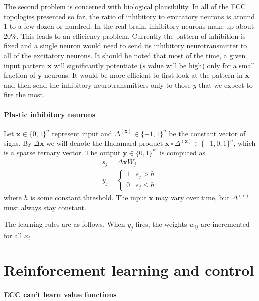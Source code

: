 \documentclass[12pt]{article}
\begin{document}
 The second problem is concerned with biological plausibility. In all of the ECC topologies presented so far, the ratio of inhibitory to excitatory neurons is around 1 to a few dozen or hundred. In the real brain, inhibitory neurons make up about 20\%. This leads to an efficiency problem. Currently the pattern of inhibition is fixed and a single neuron would need to send its inhibitory neurotransmitter to all of the excitatory neurons. It should be noted that most of the time, a given input pattern $\boldsymbol{x}$ will significantly potentiate ($s$ value will be high) only for a small fraction of $\boldsymbol{y}$ neurons. It would be more efficient to first look at the pattern in  $\boldsymbol{x}$ and then send the inhibitory  neurotransmitters only to those $y$ that we expect to fire the most.
 
 \paragraph{Plastic inhibitory neurons}
 
Let $\boldsymbol{x}\in \{0,1\}^n$ represent input and $\Delta^{(\boldsymbol{x})}\in\{-1,1\}^n$ be the constant vector of signs.
By $\Delta\boldsymbol{x}$ we will denote the Hadamard product $\boldsymbol{x}\circ\Delta^{(\boldsymbol{x})} \in \{-1,0,1\}^n$, which is a sparse ternary vector.  The output $\boldsymbol{y}\in \{0,1\}^m$ is computed as
\begin{gather*}
s_j = \Delta\boldsymbol{x} W_j \\
y_j = \begin{cases}
1 &	s_j > h \\
0 & s_j\le h
\end{cases}
\end{gather*}
where $h$ is some constant threshold. The input $\boldsymbol{x}$ may vary over time, but $\Delta^{(\boldsymbol{x})}$ must always stay constant.

The learning rules are as follows. When $y_j$ fires, the weights $w_{ij}$ are incremented for all $x_i$ 

\section{Reinforcement learning and control}

\paragraph{ECC can't learn value functions}
\end{document}
